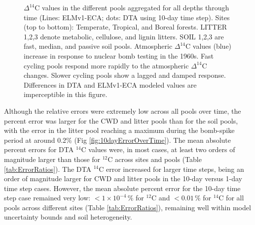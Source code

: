 \documentclass[draft]{agujournal2019}
\begin{document}
\begin{figure}[htbp]
        \vspace{-4em}
        \caption{$\Delta^{14}$C values in the different pools aggregated for all depths through time (Lines: ELMv1-ECA; dots: DTA using 10-day time step). Sites (top to bottom): Temperate, Tropical, and Boreal forests. LITTER 1,2,3 denote metabolic, cellulose, and lignin litters. SOIL 1,2,3 are fast, median, and passive soil pools. Atmospheric $\Delta^{14}$C values (blue) increase in response to nuclear bomb testing in the 1960s. Fast cycling pools respond more rapidly to the atmospheric $\Delta^{14}$C changes. Slower cycling pools show a lagged and damped response. Differences in DTA and ELMv1-ECA modeled values are imperceptible in this figure.
        \label{fig:poolsOverTime}
        }
    \end{figure}    
    
    

Although the relative errors were extremely low across all pools over time, the percent error was larger for the CWD and litter pools than for the soil pools, with the error in the litter pool reaching a maximum during the  bomb-spike period at around 0.2\% (Fig \ref{fig:10dayErrorOverTime}). The mean absolute percent errors for DTA $^{14}$C values were, in most cases, at least two orders of magnitude larger than those for $^{12}$C across sites and pools (Table \ref{tab:ErrorRatios}). The DTA $^{14}$C error increased for larger time steps, being an order of magnitude larger for CWD and litter pools in the 10-day versus 1-day time step cases. However, the mean absolute percent error for the 10-day time step case remained very low: $< 1 \times 10^{-4}\,\%$ for $^{12}$C and $<0.01\,\%$ for $^{14}$C for all pools across different sites (Table \ref{tab:ErrorRatios}), remaining well within model uncertainty bounds and soil heterogeneity.
\end{document}
